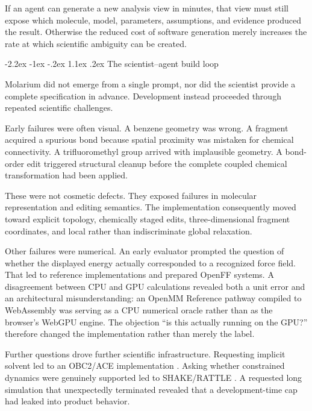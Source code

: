 \documentclass[11pt]{article}
\makeatletter
\renewcommand\section{\@startsection{section}{1}{\z@}%
  {-2.2ex \@plus -1ex \@minus -.2ex}%
  {1.1ex \@plus .2ex}%
  {\normalfont\Large\bfseries\color{molblue}}}
\makeatother
\begin{document}
If an agent can generate a new analysis view in minutes, that view must still expose which molecule, model, parameters, assumptions, and evidence produced the result. Otherwise the reduced cost of software generation merely increases the rate at which scientific ambiguity can be created.

\section{The scientist--agent build loop}

Molarium did not emerge from a single prompt, nor did the scientist provide a complete specification in advance. Development instead proceeded through repeated scientific challenges.

Early failures were often visual. A benzene geometry was wrong. A fragment acquired a spurious bond because spatial proximity was mistaken for chemical connectivity. A trifluoromethyl group arrived with implausible geometry. A bond-order edit triggered structural cleanup before the complete coupled chemical transformation had been applied.

These were not cosmetic defects. They exposed failures in molecular representation and editing semantics. The implementation consequently moved toward explicit topology, chemically staged edits, three-dimensional fragment coordinates, and local rather than indiscriminate global relaxation.

Other failures were numerical. An early evaluator prompted the question of whether the displayed energy actually corresponded to a recognized force field. That led to reference implementations and prepared OpenFF systems. A disagreement between CPU and GPU calculations revealed both a unit error and an architectural misunderstanding: an OpenMM Reference pathway compiled to WebAssembly was serving as a CPU numerical oracle rather than as the browser's WebGPU engine. The objection ``is this actually running on the GPU?'' therefore changed the implementation rather than merely the label.

Further questions drove further scientific infrastructure. Requesting implicit solvent led to an OBC2/ACE implementation \citep{onufriev2004obc,schaefer1996ace}. Asking whether constrained dynamics were genuinely supported led to SHAKE/RATTLE \citep{ryckaert1977shake,andersen1983rattle}. A requested long simulation that unexpectedly terminated revealed that a development-time cap had leaked into product behavior.
\end{document}
